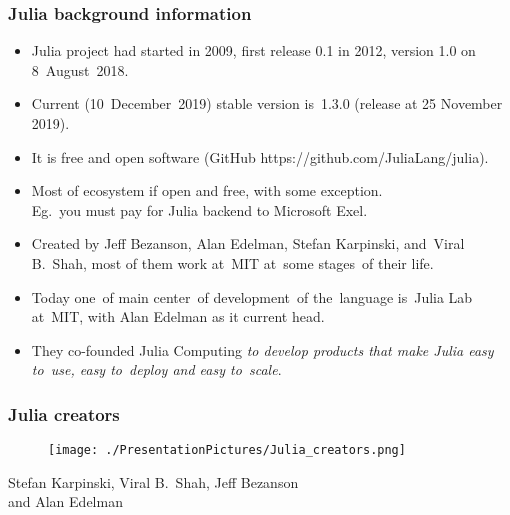 \documentclass[10pt,t]{beamer}
\begin{document}
\begin{frame}
  \frametitle{Julia background information}


  \begin{itemize}
    \RaggedRight

  \item Julia project had started in 2009, first release 0.1 in 2012,
    version 1.0 on 8~August~2018.

  \item Current (10~December~2019) stable version is~1.3.0 (release at 25
    November 2019).

  \item It is \alert{free} and \alert{open software} (GitHub
    {https://github.com/JuliaLang/julia}).

  \item Most of ecosystem if open and free, with \alert{some}
    exception. \\
    Eg.~you must pay for Julia backend to Microsoft Exel.

  \item Created by Jeff Bezanson, Alan Edelman, Stefan Karpinski,
    and~Viral B.~Shah, most of them work at~MIT at~some stages~of
    their life.

  \item Today one~of main center~of development~of the~language
    is~Julia Lab at~MIT, with Alan Edelman as it current head.

  \item They co-founded Julia Computing \textit{to develop products that
      make Julia easy to~use, easy to~deploy and easy to~scale}.

  \end{itemize}

\end{frame}





\begin{frame}
  \frametitle{Julia creators}


  \begin{figure}

    \centering

    \texttt{[image: ./PresentationPictures/Julia\_creators.png]}

  \end{figure}


  \begin{center}

    Stefan Karpinski, Viral B.~Shah, Jeff Bezanson \\
    \hspace{-12em} and Alan Edelman

  \end{center}

\end{frame}
\end{document}
